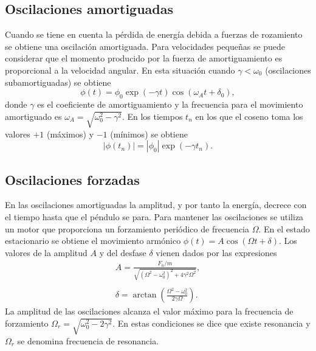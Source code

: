 \documentclass[11pt]{articulo}
\begin{document}
\subsection{Oscilaciones amortiguadas}

Cuando se tiene en cuenta la p\'erdida de energ\'ia debida a fuerzas de rozamiento se obtiene una oscilaci\'on amortiguada. Para velocidades peque\~nas se puede considerar que el momento producido por la fuerza de amortiguamiento es proporcional a la velocidad angular. En esta situaci\'on cuando $\gamma < \omega_0$ (oscilaciones subamortiguadas) se obtiene
%
\begin{equation*}
\phi (t) = \phi_0 \exp(-\gamma t) \cos(\omega_A t + \delta_0),
\end{equation*}
%
donde $\gamma$ es el coeficiente de amortiguamiento y la frecuencia para el movimiento amortiguado es $\omega_A = \sqrt{\omega_0^2 - \gamma^2}$. En los tiempos $t_n$ en los que el coseno toma los valores $+1$ (m\'aximos) y $-1$ (m\'inimos) se obtiene
%
\begin{equation}
\label{equation:exponential}
\left|\phi\left(t_n\right)\right| = \left|\phi_0\right|\exp\left(-\gamma t_n\right).
\end{equation}

\subsection{Oscilaciones forzadas}

En las oscilaciones amortiguadas la amplitud, y por tanto la energ\'ia, decrece con el tiempo hasta que el p\'endulo se para. Para mantener las oscilaciones se utiliza un motor que proporciona un forzamiento peri\'odico de frecuencia $\Omega$. En el estado estacionario se obtiene el movimiento arm\'onico $\phi(t) = A \cos ( \Omega t + \delta)$. Los valores de la amplitud $A$ y del desfase $\delta$ vienen dados por las expresiones
%
\begin{eqnarray*}
A = \frac{F_0/m}{\sqrt{\left(\Omega^2 - \omega_0^2\right)^2 + 4 \gamma^2\Omega^2}},\\
\\
\delta = \arctan\left(\frac{\Omega^2 - \omega_0^2}{2\gamma\Omega}\right).
\end{eqnarray*}
%
La amplitud de las oscilaciones alcanza el valor m\'aximo para la frecuencia de forzamiento $\Omega_r = \sqrt{\omega_0^2 - 2\gamma^2}$. En estas condiciones se dice que existe resonancia y $\Omega_r$ se denomina frecuencia de resonancia.
\end{document}
